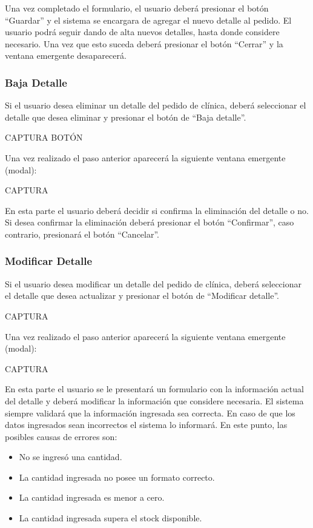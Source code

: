\documentclass[letterpaper,10pt,spanish]{sphinxmanual}
\begin{document}
Una vez completado el formulario, el usuario deberá presionar el botón “Guardar” y el sistema se encargara de agregar el nuevo detalle al pedido.
El usuario podrá seguir dando de alta nuevos detalles, hasta donde considere necesario. Una vez que esto suceda deberá presionar el botón “Cerrar” y la ventana emergente desaparecerá.


\subsubsection{Baja Detalle}
\label{pedidosclinica:baja-detalle}
Si el usuario desea eliminar un detalle del pedido de clínica, deberá seleccionar el detalle que desea eliminar y presionar el botón de “Baja detalle”.

CAPTURA BOTÓN

Una vez realizado el paso anterior aparecerá la siguiente ventana emergente (modal):

CAPTURA

En esta parte el usuario deberá decidir si confirma la eliminación del detalle o no. Si desea confirmar la eliminación deberá presionar el botón “Confirmar”, caso contrario, presionará el botón “Cancelar”.


\subsubsection{Modificar Detalle}
\label{pedidosclinica:modificar-detalle}
Si el usuario desea modificar un detalle del pedido de clínica, deberá seleccionar el detalle que desea actualizar y presionar el botón de “Modificar detalle”.

CAPTURA

Una vez realizado el paso anterior aparecerá la siguiente ventana emergente (modal):

CAPTURA

En esta parte el usuario se le presentará un formulario con la información actual del detalle y deberá modificar la información que considere necesaria.
El sistema siempre validará que la información ingresada sea correcta. En caso de que los datos ingresados sean incorrectos el sistema lo informará.
En este punto, las posibles causas de errores son:
\begin{itemize}
\item {} 
No se ingresó una cantidad.

\item {} 
La cantidad ingresada no posee un formato correcto.

\item {} 
La cantidad ingresada es menor a cero.

\item {} 
La cantidad ingresada supera el stock disponible.

\end{itemize}
\end{document}
